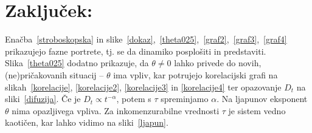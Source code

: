 \documentclass[a4paper, 12pt]{article}
\begin{document}
\section{Zaklju\v cek:}

Ena\v cba~\eqref{stroboskopska} in slike~\ref{dokaz},~\ref{theta025},~\ref{graf2},~\ref{graf3},~\ref{graf4} prikazujejo
fazne portrete, tj. se da dinamiko posplo\v siti in predstaviti. Slika~\ref{theta025} dodatno prikazuje, da $\theta \neq 0$
lahko privede do novih, (ne)pri\v cakovanih situacij -- $\theta$ ima vpliv, kar potrujejo korelacijski grafi na
slikah~\ref{korelacije}, \ref{korelacije2}, \ref{korelacije3} in \ref{korelacije4} ter opazovanje $D_t$ na
sliki~\ref{difuzija}. \v Ce je $D_t \propto t^{-\alpha}$, potem s $\tau$ spreminjamo $\alpha$. Na ljapunov eksponent
$\theta$ nima opazljivega vpliva. Za inkomenzurabilne vrednosti $\tau$ je sistem vedno kaoti\v cen, kar lahko vidimo
na sliki~\ref{ljapun}.
\end{document}
